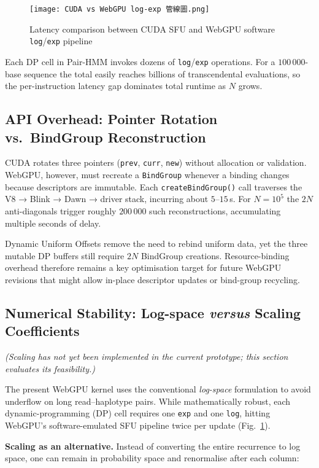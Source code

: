 \documentclass[PhD]{PHlab-thesis}
\begin{document}
\begin{figure}[h]
    \centering
    \texttt{[image: CUDA vs WebGPU log-exp 管線圖.png]}
    \caption{Latency comparison between CUDA SFU and WebGPU software \texttt{log}/\texttt{exp} pipeline}
    \label{fig:log_exp_pipeline}
\end{figure}

Each DP cell in Pair-HMM invokes dozens of \texttt{log}/\texttt{exp} operations. For a $100\,000$-base sequence the total easily reaches billions of transcendental evaluations, so the per-instruction latency gap dominates total runtime as $N$ grows.

\subsection{API Overhead: Pointer Rotation vs.\ BindGroup Reconstruction}
CUDA rotates three pointers (\texttt{prev}, \texttt{curr}, \texttt{new}) without allocation or validation.  
WebGPU, however, must recreate a \texttt{BindGroup} whenever a binding changes because descriptors are immutable. Each \texttt{createBindGroup()} call traverses the V8 → Blink → Dawn → driver stack, incurring about $5$–$15$\,\textmu s. For $N=10^{5}$ the $2N$ anti-diagonals trigger roughly $200\,000$ such reconstructions, accumulating multiple seconds of delay.

Dynamic Uniform Offsets remove the need to rebind uniform data, yet the three mutable DP buffers still require $2N$ BindGroup creations. Resource-binding overhead therefore remains a key optimisation target for future WebGPU revisions that might allow in-place descriptor updates or bind-group recycling.


\subsection{Numerical Stability: Log-space \emph{versus} Scaling Coefficients}

\textit{(Scaling has not yet been implemented in the current prototype; this section evaluates its feasibility.)}

The present WebGPU kernel uses the conventional \emph{log-space} formulation to avoid underflow on long read–haplotype pairs.  
While mathematically robust, each dynamic-programming (DP) cell requires one \texttt{exp} and one \texttt{log}, hitting WebGPU’s software-emulated SFU pipeline twice per update (Fig.~\ref{fig:log_exp_pipeline}).

\vspace{0.4em}
\noindent\textbf{Scaling as an alternative.}\;
Instead of converting the entire recurrence to log space, one can remain in probability space and renormalise after each column:
\end{document}
